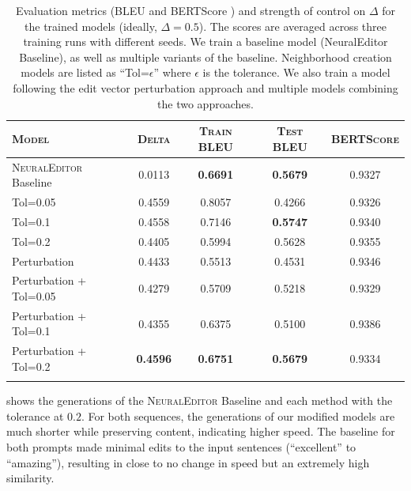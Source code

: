 \begin{table}[h]
  \centering
  \small
  \caption{Evaluation metrics (BLEU \citep{Papineni2002bleu} and BERTScore \citep{zhang2019bertscore}) and strength of control on $\Delta$ for the trained models (ideally, $\Delta = 0.5$). The scores are averaged across three training runs with different seeds. We train a baseline model \citep{guu2018generating} (NeuralEditor Baseline), as well as multiple variants of the baseline. Neighborhood creation models are listed as ``Tol=$\epsilon$'' where $\epsilon$ is the tolerance. We also train a model following the edit vector perturbation approach and multiple models combining the two approaches. }
  \label{tab:neural-editor-eval}
  \begin{tabularx}{0.9\linewidth}{@{}>{\raggedright\arraybackslash}Xcccc@{}}
   \toprule[1.5pt]
  \textsc{Model} & \textsc{Delta} & \textsc{Train BLEU} & \textsc{Test BLEU} & \textsc{BERTScore} \\     
  \midrule[0.75pt]
\textsc{NeuralEditor} Baseline    & 0.0113 & \textbf{0.6691}     & \textbf{0.5679}    & 0.9327 \\
  \midrule[0.75pt]
Tol=0.05               & 0.4559 & 0.8057     & 0.4266    & 0.9326 \\
Tol=0.1                & 0.4558 & 0.7146     & \textbf{0.5747}    & 0.9340 \\
Tol=0.2                & 0.4405 & 0.5994     & 0.5628    & 0.9355 \\
  \midrule[0.75pt]
Perturbation            & 0.4433 & 0.5513     & 0.4531    & 0.9346 \\
Perturbation + Tol=0.05 & 0.4279 & 0.5709     & 0.5218    & 0.9329 \\
Perturbation + Tol=0.1  & 0.4355 & 0.6375     & 0.5100    & 0.9386 \\
Perturbation + Tol=0.2  & \textbf{0.4596} & \textbf{0.6751}     & \textbf{0.5679}    & 0.9334 \\
  \bottomrule[1.5pt]\\
  \end{tabularx}
  \vspace{-10pt}
  \end{table}

 shows the generations of the \textsc{NeuralEditor} Baseline and each method with the tolerance at $0.2$. For both sequences, the generations of our modified models are much shorter while preserving content, indicating higher speed. The baseline for both prompts made minimal edits to the input sentences (\eg ``excellent'' to ``amazing''), resulting in close to no change in speed but an extremely high similarity. 

